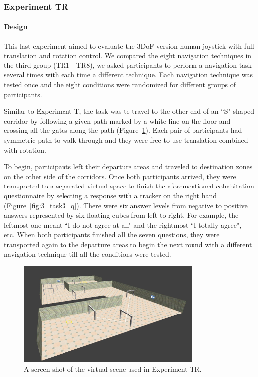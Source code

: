 \subsubsection{Experiment TR}

\paragraph{Design}
This last experiment aimed to evaluate the 3DoF version human joystick with full translation and rotation control. We compared the eight navigation techniques in the third group (TR1 - TR8), we asked participants to perform a navigation task several times with each time a different technique. Each navigation technique was tested once and the eight conditions were randomized for different groups of participants.

Similar to Experiment T, the task was to travel to the other end of an ``S" shaped corridor by following a given path marked by a white line on the floor and crossing all the gates along the path (Figure~\ref{fig:3_task3}). Each pair of participants had symmetric path to walk through and they were free to use translation combined with rotation.

To begin, participants left their departure areas and traveled to destination zones on the other side of the corridors. Once both participants arrived, they were transported to a separated virtual space to finish the aforementioned cohabitation questionnaire by selecting a response with a tracker on the right hand (Figure~\ref{fig:3_task3_q}). There were six answer levels from negative to positive answers represented by six floating cubes from left to right. For example, the leftmost one meant ``I do not agree at all" and the rightmost ``I totally agree", etc.  When both participants finished all the seven questions, they were transported again to the departure areas to begin the next round with a different navigation technique till all the conditions were tested.

\begin{figure}[tb]
  \centering
  \includegraphics[width=0.8\textwidth]{figures/ch3/t3}
  \caption{\label{fig:3_task3}A screen-shot of the virtual scene used in Experiment TR.}
\end{figure}

